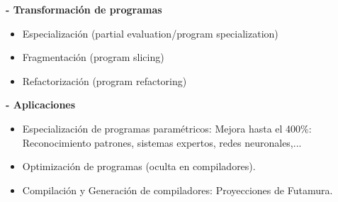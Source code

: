\documentclass[12pt]{amsart}
\begin{document}
    \textbf{- Transformación de programas}
    \begin{itemize}
        \item Especialización (partial evaluation/program
        specialization)
        \item Fragmentación (program slicing)
        \item Refactorización (program refactoring)
    \end{itemize}
    \textbf{- Aplicaciones}
    \begin{itemize}
        \item Especialización de programas paramétricos:
        Mejora hasta el 400\%: Reconocimiento patrones, sistemas
        expertos, redes neuronales,...
        \item Optimización de programas (oculta en compiladores).
        \item Compilación y Generación de compiladores: Proyecciones de 
        Futamura.
    \end{itemize}
\end{document}
